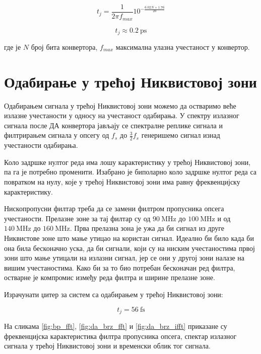 \documentclass[conference]{IEEEJERM}
\begin{document}
\begin{equation}
t_j = \frac{1}{2 \pi f_{max}} 10^{-\frac{6.02N +1.76}{20}}
\end{equation}

\begin{equation}
t_j \approx  \SI{0.2}{\pico\s}
\end{equation}

\noindent где је $N$ број бита конвертора,  $f_{max}$ максимална улазна учестаност у конвертор.

\section{Одабирање у трећој Никвистовој зони}

Одабирањем сигнала у трећој Никвистовој зони можемо да остваримо веће излазне учестаности у односу на учестаност одабирања.
 У спектру излазног сигнала после ДА конвертора јављају се спектралне реплике сигнала и филтрирањем сигнала 
 у опсегу од $f_s$ до $\frac{3}{2} f_s $ генеришемо сигнал изнад учестаности одабирања.

Коло задршке нултог реда има лошу карактеристику у трећој Никвистовој зони, па га је потребно променити. 
Изабрано је биполарно коло задршке нултог реда са повратком на нулу, које у трећој Никвистовој зони има равну фреквенцијску карактеристику.

Нископропусни филтар треба да се замени филтром пропусника опсега учестаности. 
Прелазне зоне за тај филтар су од $\SI{90}{\mega\hertz}$ до $\SI{100}{\mega\hertz}$ и од $\SI{140}{\mega\hertz}$ до $\SI{160}{\mega\hertz}$.
Прва прелазна зона је ужа да би сигнал из друге Никвистове зоне што мање утицао на користан сигнал.
Идеално би било када би она била бесконачно уска, да би сигнали, који су на ниским учестаностима првој зони што мање утицали на излазни сигнал,
јер се они у другој зони налазе на вишим учестаностима. Како би за то био потребан бесконачан ред филтра, остварне је компромис између реда филтра
и ширине прелазне зоне.


Израчунати џитер за систем са одабирањем у трећој Никвистовој зони:

\begin{equation}
t_{j} = \SI{56}{\femto\second}
\end{equation}

На сликама \ref{fig:bp_fft}, \ref{fig:da_brz_fft} и \ref{fig:da_brz_ifft} приказане су фреквенцијска карактеристика филтра пропусника опсега,
спектар излазног сигнала у трећој Никвистовој зони и временски облик тог сигнала.
\end{document}
